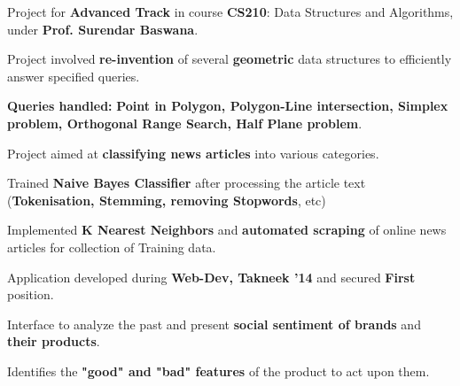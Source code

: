 \documentclass[a4paper]{norm-resume}
\begin{document}
	\vspace{2mm}
	
	   
	\begin{tightitemize}
	\small
	{
	\item Project for \textbf{Advanced Track} in course \textbf{CS210}: Data Structures and Algorithms, under \textbf{Prof. Surendar Baswana}.
	\item Project involved \textbf{re-invention} of several \textbf{geometric} data structures to efficiently answer specified queries.	
	\item \textbf{Queries handled:} \textbf{Point in Polygon, Polygon-Line intersection, Simplex problem, Orthogonal Range Search, Half Plane problem}.
	}
	\end{tightitemize}
 		
	\vspace{2mm}
		
	   \descript{Jan '14 - Apr '14}
	\begin{tightitemize}
	\small
	{
	\item Project aimed at \textbf{classifying news articles} into various categories.
	\item Trained \textbf{Naive Bayes Classifier} after processing the article text (\textbf{Tokenisation, Stemming, removing Stopwords}, etc)
	\item Implemented \textbf{K Nearest Neighbors} and \textbf{automated scraping} of online news articles for collection of Training data.
	}
	\end{tightitemize}
 		
	\vspace{2mm}
	
	   \descript{Aug' 14}
	\begin{tightitemize}
	\small
	{
	\item Application developed during \textbf{Web-Dev, Takneek '14} and secured \textbf{First} position.
	\item Interface to analyze the past and present \textbf{social sentiment of brands} and \textbf{their products}.
	\item Identifies the \textbf{"good" and "bad" features} of the product to act upon them.
	}
	\end{tightitemize}
 		
	\vspace{2mm}
	
\end{document}
